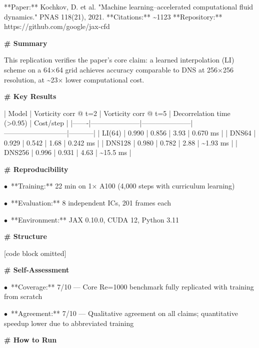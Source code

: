\documentclass[11pt]{article}
\begin{document}
**Paper:** Kochkov, D. et al. "Machine learning–accelerated computational fluid dynamics." PNAS 118(21), 2021.  
**Citations:** \textasciitilde{}1123  
**Repository:** https://github.com/google/jax-cfd

\par\medskip\textbf{\# Summary}\par

This replication verifies the paper's core claim: a learned interpolation (LI) scheme on a 64×64 grid achieves accuracy comparable to DNS at 256×256 resolution, at \textasciitilde{}23× lower computational cost.

\par\medskip\textbf{\# Key Results}\par

| Model | Vorticity corr @ t=2 | Vorticity corr @ t=5 | Decorrelation time (\textgreater{}0.95) | Cost/step |
|-------|---------------------|---------------------|---------------------------|-----------|
| LI(64) | 0.990 | 0.856 | 3.93 | 0.670 ms |
| DNS64 | 0.929 | 0.542 | 1.68 | 0.242 ms |
| DNS128 | 0.980 | 0.782 | 2.88 | \textasciitilde{}1.93 ms |
| DNS256 | 0.996 | 0.931 | 4.63 | \textasciitilde{}15.5 ms |

\par\medskip\textbf{\# Reproducibility}\par
\par$\bullet$\ **Training:** 22 min on 1× A100 (4,000 steps with curriculum learning)
\par$\bullet$\ **Evaluation:** 8 independent ICs, 201 frames each
\par$\bullet$\ **Environment:** JAX 0.10.0, CUDA 12, Python 3.11

\par\medskip\textbf{\# Structure}\par

[code block omitted]

\par\medskip\textbf{\# Self-Assessment}\par
\par$\bullet$\ **Coverage:** 7/10 — Core Re=1000 benchmark fully replicated with training from scratch
\par$\bullet$\ **Agreement:** 7/10 — Qualitative agreement on all claims; quantitative speedup lower due to abbreviated training

\par\medskip\textbf{\# How to Run}\par
\end{document}

